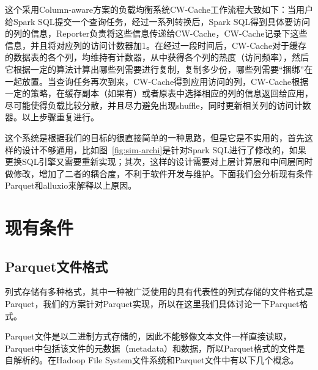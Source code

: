 \par 这个采用Column-aware方案的负载均衡系统CW-Cache工作流程大致如下：当用户给Spark SQL提交一个查询任务，经过一系列转换后，Spark SQL得到具体要访问的列的信息，Reporter负责将这些信息传递给CW-Cache，CW-Cache记录下这些信息，并且将对应列的访问计数器加1。在经过一段时间后，CW-Cache对于缓存的数据表的各个列，均维持有计数器，从中获得各个列的热度（访问频率），然后它根据一定的算法计算出哪些列需要进行复制，复制多少份，哪些列需要“捆绑”在一起放置。当查询任务再次到来，CW-Cache得到应用访问的列，CW-Cache根据一定的策略，在缓存副本（如果有）或者原表中选择相应的列的信息返回给应用，尽可能使得负载比较分散，并且尽力避免出现shuffle，同时更新相关列的访问计数器。以上步骤重复进行。

\par 这个系统是根据我们的目标的很直接简单的一种思路，但是它是不实用的，首先这样的设计不够通用，比如图~\ref{fig:sim-archi}是针对Spark SQL进行了修改的，如果更换SQL引擎又需要重新实现；其次，这样的设计需要对上层计算层和中间层同时做修改，增加了二者的耦合度，不利于软件开发与维护。下面我们会分析现有条件Parquet和alluxio来解释以上原因。

\section{现有条件}

\subsection{Parquet文件格式}

\par 列式存储有多种格式，其中一种被广泛使用的具有代表性的列式存储的文件格式是Parquet，我们的方案针对Parquet实现，所以在这里我们具体讨论一下Parquet格式。

\par Parquet文件是以二进制方式存储的，因此不能够像文本文件一样直接读取，Parquet中包括该文件的元数据（metadata）和数据，所以Parquet格式的文件是自解析的。在Hadoop File System文件系统和Parquet文件中有以下几个概念。

